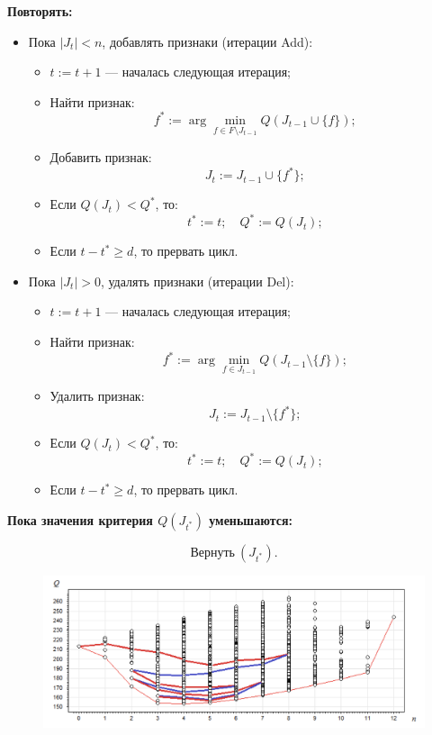 \textbf{Повторять:}
\begin{itemize}
    \item Пока \( |J_t| < n \), добавлять признаки (итерации Add):
    \begin{itemize}
        \item \( t := t + 1 \) — началась следующая итерация;
        \item Найти признак:
        \[
        f^* := \arg \min_{f \in F \setminus J_{t-1}} Q(J_{t-1} \cup \{f\});
        \]
        \item Добавить признак:
        \[
        J_t := J_{t-1} \cup \{f^*\};
        \]
        \item Если \( Q(J_t) < Q^* \), то:
        \[
        t^* := t; \quad Q^* := Q(J_t);
        \]
        \item Если \( t - t^* \geq d \), то прервать цикл.
    \end{itemize}
    \item Пока \( |J_t| > 0 \), удалять признаки (итерации Del):
    \begin{itemize}
        \item \( t := t + 1 \) — началась следующая итерация;
        \item Найти признак:
        \[
        f^* := \arg \min_{f \in J_{t-1}} Q(J_{t-1} \setminus \{f\});
        \]
        \item Удалить признак:
        \[
        J_t := J_{t-1} \setminus \{f^*\};
        \]
        \item Если \( Q(J_t) < Q^* \), то:
        \[
        t^* := t; \quad Q^* := Q(J_t);
        \]
        \item Если \( t - t^* \geq d \), то прервать цикл.
    \end{itemize}
\end{itemize}

\textbf{Пока значения критерия \( Q(J_{t^*}) \) уменьшаются:}

\[ \text{Вернуть} \ ( J_{t^*} ).\]


\begin{figure}[h!!!!!!!!!!]
	\centering
	\includegraphics[width=1\linewidth]{add-del.png}
\end{figure}



